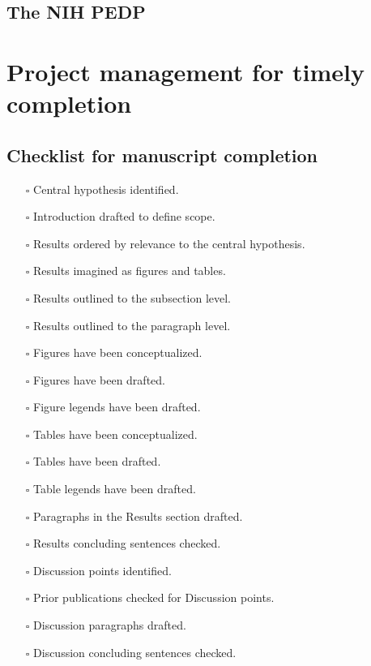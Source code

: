 \documentclass[11pt,letterpaper]{article}
\begin{document}
\subsection{The NIH PEDP}
\label{sec:org20c2c36}


\section{Project management for timely completion}
\label{sec:orgc945418}
\subsection{Checklist for manuscript completion}
\label{sec:org6f0ef94}


\begin{itemize}
\item[{$\square$}] Central hypothesis identified.
\item[{$\square$}] Introduction drafted to define scope.
\item[{$\square$}] Results ordered by relevance to the central hypothesis.
\item[{$\square$}] Results imagined as figures and tables.
\item[{$\square$}] Results outlined to the subsection level.
\item[{$\square$}] Results outlined to the paragraph level.
\item[{$\square$}] Figures have been conceptualized.
\item[{$\square$}] Figures have been drafted.
\item[{$\square$}] Figure legends have been drafted.
\item[{$\square$}] Tables have been conceptualized.
\item[{$\square$}] Tables have been drafted.
\item[{$\square$}] Table legends have been drafted.
\item[{$\square$}] Paragraphs in the Results section drafted.
\item[{$\square$}] Results concluding sentences checked.
\item[{$\square$}] Discussion points identified.
\item[{$\square$}] Prior publications checked for Discussion points.
\item[{$\square$}] Discussion paragraphs drafted.
\item[{$\square$}] Discussion concluding sentences checked.

\end{itemize}
\end{document}
